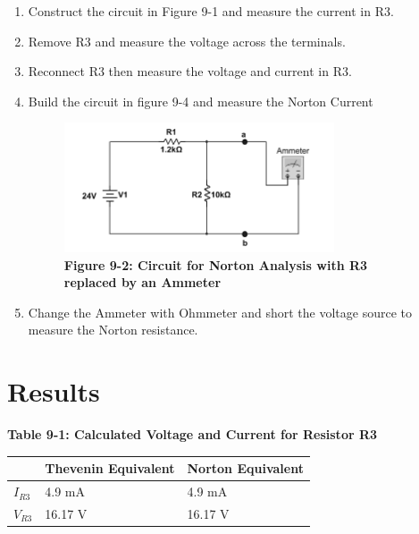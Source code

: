 \documentclass[a4paper]{article}
\begin{document}
    \begin{enumerate}
        \item Construct the circuit in Figure 9-1 and measure the current in R3.
        \item Remove R3 and measure the voltage across the terminals.
        \item Reconnect R3 then measure the voltage and current in R3.
        \item Build the circuit in figure 9-4 and measure the Norton Current
        \begin{center}
            \begin{figure}[H]\label{fig9-4}
                \begin{center}
                    \includegraphics[width = 8cm]{Fig9-4}\\
                    \small\textbf{Figure 9-2: Circuit for Norton Analysis with R3 replaced by an Ammeter \cite{UNCC-ECE-Dept:2023}}\\
                \end{center}
            \end{figure}
        \end{center}
        \item Change the Ammeter with Ohmmeter and short the voltage source to measure the Norton resistance.
    \end{enumerate}
     


\section{Results}

\begin{center}
    \small\textbf{Table 9-1: Calculated Voltage and Current for Resistor R3 \cite{UNCC-ECE-Dept:2023}}
    \begin{tabular}{|p{3 cm}|p{3cm}|p{3 cm}|}
        \hline
         & Thevenin Equivalent & Norton Equivalent\\
        \hline
        $I_{R3}$ & 4.9 mA & 4.9 mA  \\
        \hline
        $V_{R3}$ & 16.17 V & 16.17 V  \\
        \hline
        
    \end{tabular}
\end{center}
\end{document}

